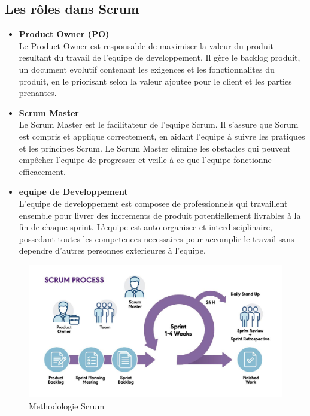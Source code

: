 \documentclass[a4paper, 11pt, openany]{report}
\begin{document}
\subsection{Les rôles dans Scrum}

\begin{itemize}
    \item \textbf{Product Owner (PO)} \\
    Le Product Owner est responsable de maximiser la valeur du produit resultant du travail de l'equipe de developpement. Il gère le backlog produit, un document evolutif contenant les exigences et les fonctionnalites du produit, en le priorisant selon la valeur ajoutee pour le client et les parties prenantes.
    
    \item \textbf{Scrum Master} \\
    Le Scrum Master est le facilitateur de l'equipe Scrum. Il s'assure que Scrum est compris et applique correctement, en aidant l'equipe à suivre les pratiques et les principes Scrum. Le Scrum Master elimine les obstacles qui peuvent empêcher l'equipe de progresser et veille à ce que l'equipe fonctionne efficacement.
    
    \item \textbf{equipe de Developpement} \\
    L'equipe de developpement est composee de professionnels qui travaillent ensemble pour livrer des increments de produit potentiellement livrables à la fin de chaque sprint. L'equipe est auto-organisee et interdisciplinaire, possedant toutes les competences necessaires pour accomplir le travail sans dependre d'autres personnes exterieures à l'equipe.
\end{itemize}

\begin{figure}[H]
\centering
\includegraphics[width=\textwidth]{scrum.jpg}
\caption{Methodologie Scrum}
\label{fig:methodologie_scrum}
\end{figure}
\end{document}
